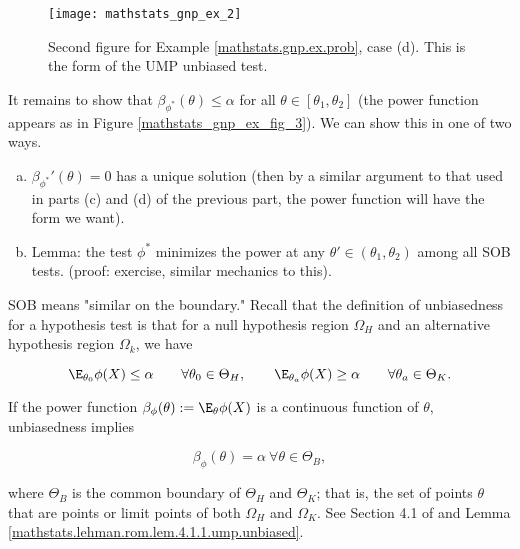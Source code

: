 \begin{solution}
\begin{enumerate}[(a)]
\begin{figure}[htbp]
\begin{center}
\texttt{[image: mathstats\_gnp\_ex\_2]}
\caption{Second figure for Example \ref{mathstats.gnp.ex.prob}, case (d). This is the form of the UMP unbiased test.}
\label{mathstats_gnp_ex_fig_2}
\end{center}
\end{figure}


\end{enumerate}

It remains to show that \(\beta_{\phi^*}(\theta) \leq \alpha\) for all \(\theta \in [\theta_1, \theta_2]\) (the power function appears as in Figure \ref{mathstats_gnp_ex_fig_3}). We can show this in one of two ways.

\begin{enumerate}[(a)]

\item \(\beta_{\phi^*}'(\theta) = 0\) has a unique solution (then by a similar argument to that used in parts (c) and (d) of the previous part, the power function will have the form we want).

\item Lemma: the test \(\phi^*\) minimizes the power at any \(\theta' \in (\theta_1, \theta_2)\) among all SOB tests.  (proof: exercise, similar mechanics to this).

\end{enumerate}

\begin{remark}

SOB means "similar on the boundary." Recall that the definition of unbiasedness for a hypothesis test is that for a null hypothesis region \(\Omega_H\) and an alternative hypothesis region \(\Omega_k\), we have

\[
\E_{\theta_0} \phi(X) \leq \alpha \qquad \forall \theta_0 \in \Theta_H, \qquad \E_{\theta_a} \phi(X) \geq \alpha \qquad \forall \theta_a \in \Theta_K.
\]

If the power function \(\beta_\phi(\theta) := \E_\theta \phi(X)\) is a continuous function of \(\theta\), unbiasedness implies 

\begin{equation}\label{mathstats.sob.cond}
\beta_\phi(\theta) = \alpha \ \forall \theta \in \Theta_B,
\end{equation}

 where \(\Theta_B\) is the common boundary of \(\Theta_H\) and \(\Theta_K\); that is, the set of points \(\theta\) that are points or limit points of both \(\Omega_H\) and \(\Omega_K\). See Section 4.1 of \citet{lehmann2005testing} and Lemma \ref{mathstats.lehman.rom.lem.4.1.1.ump.unbiased}.
 

\end{remark}
\end{solution}
